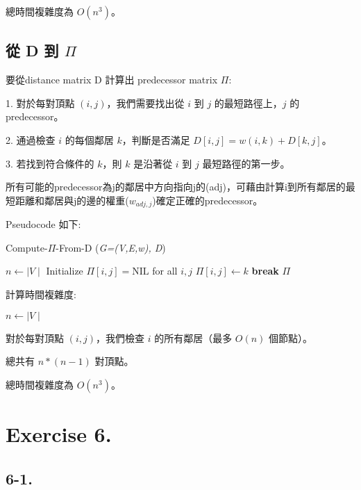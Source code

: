 \documentclass[UTF8, a4paper, 11pt]{report}
\begin{document}
總時間複雜度為 $O(n^3)$。

\pagebreak

\subsection*{從 D 到 $\Pi$}

要從distance matrix D 計算出 predecessor matrix $\Pi$:

1. 對於每對頂點 $(i,j)$，我們需要找出從 $i$ 到 $j$ 的最短路徑上，$j$ 的predecessor。

2. 通過檢查 $i$ 的每個鄰居 $k$，判斷是否滿足 $D[i,j] = w(i,k) + D[k,j]$。

3. 若找到符合條件的 $k$，則 $k$ 是沿著從 $i$ 到 $j$ 最短路徑的第一步。

所有可能的predecessor為j的鄰居中方向指向j的(adj)，可藉由計算i到所有鄰居的最短距離和鄰居與j的邊的權重($w_{adj,j}$)確定正確的predecessor。

Pseudocode 如下:

\begin{algorithm}
    \caption{Compute-$\Pi$-From-D (\textit{G=(V,E,w), D})}
    \begin{algorithmic}[1]
        \State $n \gets \mid V\mid$
        \State Initialize $\Pi[i,j] = \text{NIL}$ for all $i,j$
        \State $\Pi[i,j] \gets k$
        \State \textbf{break}
        \EndIf
        \EndFor
        \EndIf
        \EndFor
        \EndFor
        \State \Return $\Pi$
    \end{algorithmic}
\end{algorithm}

計算時間複雜度:

$n \gets \mid V\mid$

對於每對頂點 $(i,j)$，我們檢查 $i$ 的所有鄰居（最多 $O(n)$ 個節點）。

總共有 $n * (n-1)$ 對頂點。

總時間複雜度為 $O(n^3)$。

\pagebreak

\section*{Exercise 6.}

\subsection*{6-1.}
\end{document}

